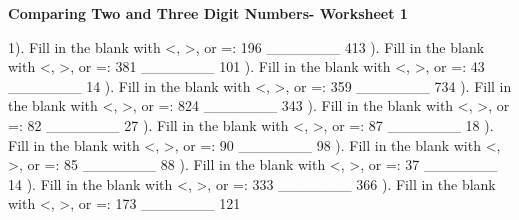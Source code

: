 \documentclass{article}%
\begin{document}
\pagebreak%
\large%
\begin{center}%
\textbf{Comparing Two and Three Digit Numbers- Worksheet 1}%
\newline%
\end{center} \normalsize%
1). Fill in the blank with <, >, or =: 196 \_\_\_\_\_\_\_ 413%
\newline%
\newline%
). Fill in the blank with <, >, or =: 381 \_\_\_\_\_\_\_ 101%
\newline%
\newline%
). Fill in the blank with <, >, or =: 43 \_\_\_\_\_\_\_ 14%
\newline%
\newline%
). Fill in the blank with <, >, or =: 359 \_\_\_\_\_\_\_ 734%
\newline%
\newline%
). Fill in the blank with <, >, or =: 824 \_\_\_\_\_\_\_ 343%
\newline%
\newline%
). Fill in the blank with <, >, or =: 82 \_\_\_\_\_\_\_ 27%
\newline%
\newline%
). Fill in the blank with <, >, or =: 87 \_\_\_\_\_\_\_ 18%
\newline%
\newline%
). Fill in the blank with <, >, or =: 90 \_\_\_\_\_\_\_ 98%
\newline%
\newline%
). Fill in the blank with <, >, or =: 85 \_\_\_\_\_\_\_ 88%
\newline%
\newline%
). Fill in the blank with <, >, or =: 37 \_\_\_\_\_\_\_ 14%
\newline%
\newline%
). Fill in the blank with <, >, or =: 333 \_\_\_\_\_\_\_ 366%
\newline%
\newline%
). Fill in the blank with <, >, or =: 173 \_\_\_\_\_\_\_ 121%
\end{document}
